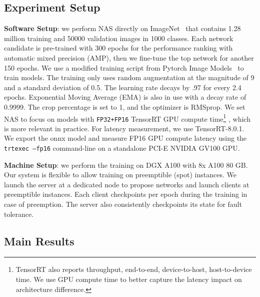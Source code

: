 \documentclass[10pt,twocolumn,letterpaper]{article}
\begin{document}
\subsection{Experiment Setup}
\textbf{Software Setup}: we perform NAS directly on ImageNet~\cite{deng2009imagenet} that contains 1.28 million training and 50000 validation images in 1000 classes. Each network candidate is pre-trained with 300 epochs for the performance ranking with automatic mixed precision (AMP), then we fine-tune the top network for another 150 epochs. We use a modified training script from Pytorch Image Models~\cite{pytorchimagemodels} to train models. The training only uses random augmentation at the magnitude of 9 and a standard deviation of 0.5. The learning rate decays by .97 for every 2.4 epochs. Exponential Moving Average (EMA) is also in use with a decay rate of 0.9999. The crop percentage is set to 1, and the optimizer is RMSprop. We set NAS to focus on models with \texttt{FP32+FP16} TensorRT GPU compute time\footnote{TensorRT also reports throughput, end-to-end, device-to-host, host-to-device time. We use GPU compute time to better capture the latency impact on architecture difference.} , which is more relevant in practice. For latency measurement, we use TensorRT-8.0.1. We export the onnx model and measure FP16 GPU compute latency using the \texttt{trtexec --fp16} command-line on a standalone PCI-E NVIDIA GV100 GPU.


\textbf{Machine Setup}: we perform the training on DGX A100 with 8x A100 80 GB. Our system is flexible to allow training on preemptible (spot) instances. We launch the server at a dedicated node to propose networks and launch clients at preemptible instances. Each client checkpoints per epoch during the training in case of preemption. The server also consistently checkpoints its state for fault tolerance.

\subsection{Main Results}
\end{document}
